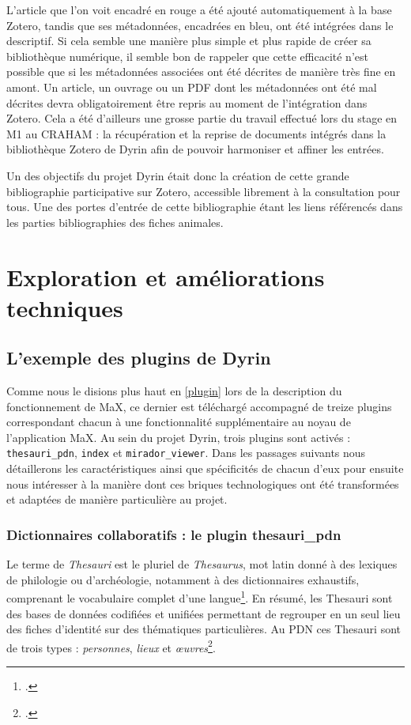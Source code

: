 \documentclass[a4paper,12pt,twoside]{book}
\begin{document}
L'article que l'on voit encadré en rouge a été ajouté automatiquement à la base Zotero, tandis que ses métadonnées, encadrées en bleu, ont été intégrées dans le descriptif.
Si cela semble une manière plus simple et plus rapide de créer sa bibliothèque numérique, il semble bon de rappeler que cette efficacité n'est possible que si les métadonnées associées ont été décrites de manière très fine en amont. Un article, un ouvrage ou un PDF dont les métadonnées ont été mal décrites devra obligatoirement être repris au moment de l'intégration dans Zotero. Cela a été d'ailleurs une grosse partie du travail effectué lors du stage en M1 au \acrshort{CRAHAM} : la récupération et la reprise de documents intégrés dans la bibliothèque Zotero de Dyrin afin de pouvoir harmoniser et affiner les entrées.


Un des objectifs du projet Dyrin était donc la création de cette grande bibliographie participative sur Zotero, accessible librement à la consultation pour tous. Une des portes d'entrée de cette bibliographie étant les liens référencés dans les parties bibliographies des fiches animales.\\



\chapter{Exploration et améliorations techniques}
\section{L'exemple des plugins de Dyrin}\label{plugin-dyrin}
Comme nous le disions plus haut en \ref{plugin} lors de la description du fonctionnement de MaX, ce dernier est téléchargé accompagné de treize plugins correspondant chacun à une fonctionnalité supplémentaire au noyau de l'application MaX. Au sein du projet Dyrin, trois plugins sont activés : \texttt{thesauri\_pdn}, \texttt{index} et \texttt{mirador\_viewer}. Dans les passages suivants nous détaillerons les caractéristiques ainsi que spécificités de chacun d'eux pour ensuite nous intéresser à la manière dont ces briques technologiques ont été transformées et adaptées de manière particulière au projet.

\subsection{Dictionnaires collaboratifs : le plugin thesauri\_pdn}\label{thesauri}
Le terme de \textit{Thesauri} est le pluriel de \textit{Thesaurus}, mot latin donné à des lexiques de philologie ou d'archéologie, notamment à des dictionnaires exhaustifs, comprenant le vocabulaire complet d'une langue\footcite{def_thesau}. En résumé, les Thesauri sont des bases de données codifiées et unifiées permettant de regrouper en un seul lieu des fiches d'identité sur des thématiques particulières. Au \acrshort{PDN} ces Thesauri sont de trois types : \textit{personnes}, \textit{lieux} et \textit{\oe{}uvres}\footcite{thesauri}.
\end{document}
